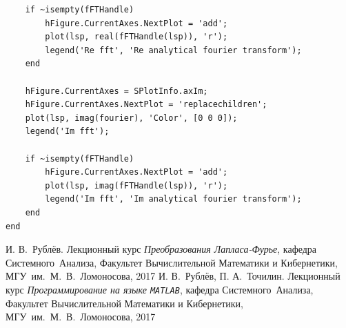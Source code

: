 \documentclass[11pt, oneside, final]{article}
\numberwithin{equation}{section}
\begin{document}
\begin{verbatim}
    if ~isempty(fFTHandle) 
        hFigure.CurrentAxes.NextPlot = 'add';
        plot(lsp, real(fFTHandle(lsp)), 'r');
        legend('Re fft', 'Re analytical fourier transform');
    end

    hFigure.CurrentAxes = SPlotInfo.axIm;
    hFigure.CurrentAxes.NextPlot = 'replacechildren';
    plot(lsp, imag(fourier), 'Color', [0 0 0]);
    legend('Im fft');

    if ~isempty(fFTHandle) 
        hFigure.CurrentAxes.NextPlot = 'add';
        plot(lsp, imag(fFTHandle(lsp)), 'r');
        legend('Im fft', 'Im analytical fourier transform');
    end
end
    \end{verbatim}
    \begin{thebibliography}{0}
         И. В.~Рублёв. Лекционный курс \emph{Преобразования Лапласа-Фурье},
        кафедра Системного~Анализа, Факультет Вычислительной Математики и Кибернетики, МГУ~им.~М.~В.~Ломоносова, 
        2017
         И. В.~Рублёв, П. А.~Точилин. Лекционный курс \emph{Программирование на языке \texttt{MATLAB}},
        кафедра Системного~Анализа, Факультет Вычислительной Математики и Кибернетики, МГУ~им.~М.~В.~Ломоносова, 
        2017
    \end{thebibliography}
\end{document}
